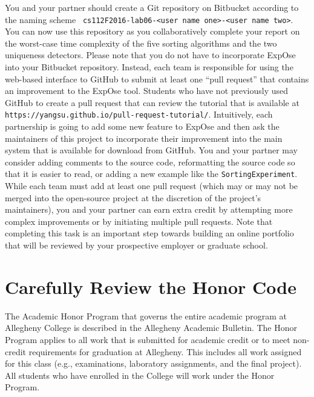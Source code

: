 You and your partner should create a Git repository on Bitbucket according to the naming scheme {\tt
cs112F2016-lab06-<user name one>-<user name two>}. You can now use this repository as you collaboratively complete your
report on the worst-case time complexity of the five sorting algorithms and the two uniqueness detectors. Please note
that you do not have to incorporate {\sc ExpOse} into your Bitbucket repository. Instead, each team is responsible for
using the web-based interface to GitHub to submit at least one ``pull request'' that contains an improvement to the {\sc
ExpOse} tool. Students who have not previously used GitHub to create a pull request that can review the tutorial that is
available at {\tt https://yangsu.github.io/pull-request-tutorial/}. Intuitively, each partnership is going to add some
new feature to {\sc ExpOse} and then ask the maintainers of this project to incorporate their improvement into the main
system that is available for download from GitHub. You and your partner may consider adding comments to the source code,
reformatting the source code so that it is easier to read, or adding a new example like the {\tt SortingExperiment}.
While each team must add at least one pull request (which may or may not be merged into the open-source project at the
discretion of the project's maintainers), you and your partner can earn extra credit by attempting more complex
improvements or by initiating multiple pull requests. Note that completing this task is an important step towards
building an online portfolio that will be reviewed by your prospective employer or graduate school.

\section*{Carefully Review the Honor Code}

The Academic Honor Program that governs the entire academic program at Allegheny College is described in the Allegheny
Academic Bulletin. The Honor Program applies to all work that is submitted for academic credit or to meet non-credit
requirements for graduation at Allegheny. This includes all work assigned for this class (e.g., examinations, laboratory
assignments, and the final project). All students who have enrolled in the College will work under the Honor Program.


